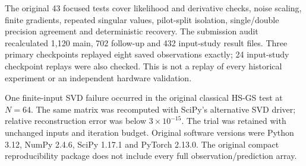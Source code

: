 \documentclass[journal]{IEEEtran}
\begin{document}
The original 43 focused tests cover likelihood and derivative checks,
noise scaling, finite gradients, repeated singular values, pilot-split
isolation, single/double precision agreement and deterministic recovery.
The submission audit recalculated 1,120 main, 702 follow-up and 432
input-study result files. Three primary checkpoints replayed eight saved
observations exactly; 24 input-study checkpoint replays were also checked.
This is not a replay of every historical experiment or an independent
hardware validation.

One finite-input SVD failure occurred in the original classical HS-GS
test at $N=64$. The same matrix was recomputed with SciPy's alternative
SVD driver; relative reconstruction error was below $3\times10^{-15}$.
The trial was retained with unchanged inputs and iteration budget.
Original software versions were Python 3.12, NumPy 2.4.6, SciPy 1.17.1
and PyTorch 2.13.0. The original compact reproducibility package does not
include every full observation/prediction array.


\end{document}
